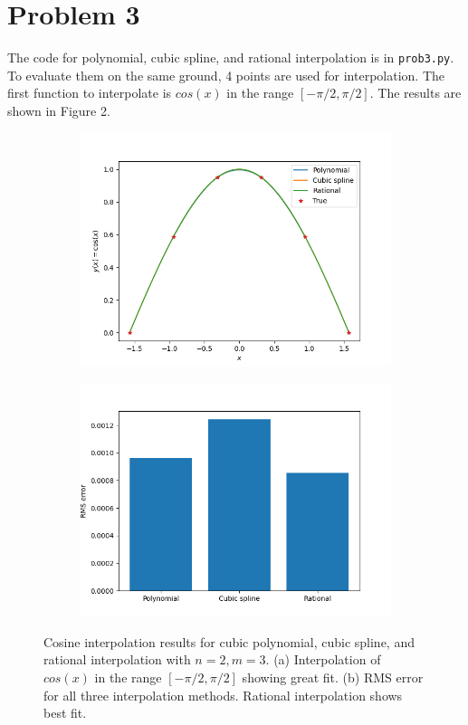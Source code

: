 \documentclass{article}
\begin{document}
\section*{Problem 3}
The code for polynomial, cubic spline, and rational interpolation is in \verb|prob3.py|. To evaluate them on the same ground, 4 points are used for interpolation. The first function to interpolate is $cos(x)$ in the range $[-\pi/2,\pi/2]$. The results are shown in Figure 2.
\begin{figure}[h!]
\centering
\begin{subfigure}{.5\textwidth}
  \centering
  \includegraphics[width=\linewidth]{images/prob3_cos_func.png}
  \caption{}
\end{subfigure}%
\begin{subfigure}{.5\textwidth}
  \centering
  \includegraphics[width=\linewidth]{images/prob3_cos_errs.png}
  \caption{}
\end{subfigure}
\caption{Cosine interpolation results for cubic polynomial, cubic spline, and rational interpolation with $n=2, m=3$. (a) Interpolation of $cos(x)$ in the range $[-\pi/2, \pi/2]$ showing great fit. (b) RMS error for all three interpolation methods. Rational interpolation shows best fit.}
\label{fig:cos_results}
\end{figure}
\end{document}
